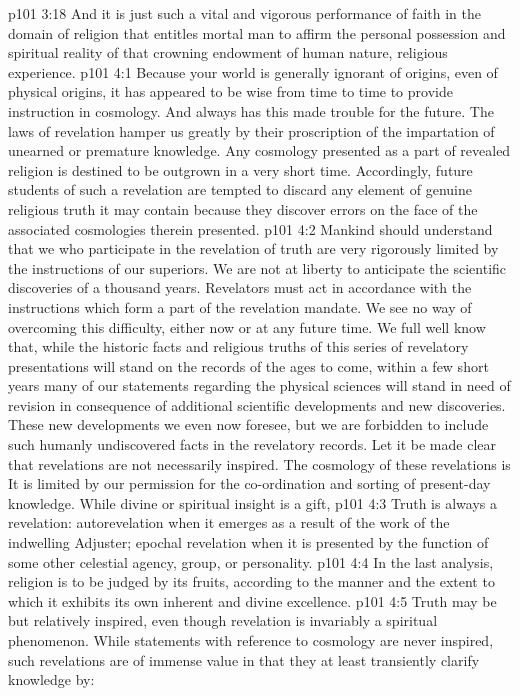 \vs p101 3:18 And it is just such a vital and vigorous performance of faith in the domain of religion that entitles mortal man to affirm the personal possession and spiritual reality of that crowning endowment of human nature, religious experience.
\vs p101 4:1 Because your world is generally ignorant of origins, even of physical origins, it has appeared to be wise from time to time to provide instruction in cosmology. And always has this made trouble for the future. The laws of revelation hamper us greatly by their proscription of the impartation of unearned or premature knowledge. Any cosmology presented as a part of revealed religion is destined to be outgrown in a very short time. Accordingly, future students of such a revelation are tempted to discard any element of genuine religious truth it may contain because they discover errors on the face of the associated cosmologies therein presented.
\vs p101 4:2 Mankind should understand that we who participate in the revelation of truth are very rigorously limited by the instructions of our superiors. We are not at liberty to anticipate the scientific discoveries of a thousand years. Revelators must act in accordance with the instructions which form a part of the revelation mandate. We see no way of overcoming this difficulty, either now or at any future time. We full well know that, while the historic facts and religious truths of this series of revelatory presentations will stand on the records of the ages to come, within a few short years many of our statements regarding the physical sciences will stand in need of revision in consequence of additional scientific developments and new discoveries. These new developments we even now foresee, but we are forbidden to include such humanly undiscovered facts in the revelatory records. Let it be made clear that revelations are not necessarily inspired. The cosmology of these revelations is  It is limited by our permission for the co\hyp{}ordination and sorting of present\hyp{}day knowledge. While divine or spiritual insight is a gift, 
\pc \vs p101 4:3 Truth is always a revelation: autorevelation when it emerges as a result of the work of the indwelling Adjuster; epochal revelation when it is presented by the function of some other celestial agency, group, or personality.
\vs p101 4:4 In the last analysis, religion is to be judged by its fruits, according to the manner and the extent to which it exhibits its own inherent and divine excellence.
\pc \vs p101 4:5 Truth may be but relatively inspired, even though revelation is invariably a spiritual phenomenon. While statements with reference to cosmology are never inspired, such revelations are of immense value in that they at least transiently clarify knowledge by:
